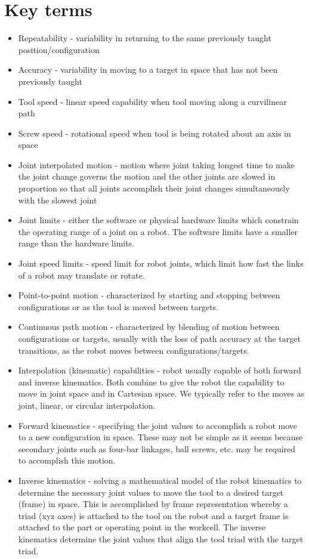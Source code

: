 \section{Key terms}
\begin{itemize}
\item 	Repeatability - variability in returning to the same previously taught position/configuration
\item Accuracy - variability in moving to a target in space that has not been previously taught
\item Tool speed - linear speed capability when tool moving along a curvilinear path
\item Screw speed - rotational speed when tool is being rotated about an axis in space
\item Joint interpolated motion - motion where joint taking longest time to make the joint change governs the motion and the other joints are slowed in proportion so that all joints accomplish their joint changes simultaneously with the slowest joint
\item Joint limits - either the software or physical hardware limits which constrain the operating range of a joint on a robot. The software limits have a smaller range than the hardware limits.
\item Joint speed limits - speed limit for robot joints, which limit how fast the links of a robot may translate or rotate.
\item Point-to-point motion - characterized by starting and stopping between configurations or as the tool is moved between targets.
\item Continuous path motion - characterized by blending of motion between configurations or targets, usually with the loss of path accuracy at the target transitions, as the robot moves between configurations/targets.
\item Interpolation (kinematic) capabilities - robot usually capable of both forward and inverse kinematics. Both combine to give the robot the capability to move in joint space and in  Cartesian space. We typically refer to the moves as joint, linear, or circular interpolation.
\item Forward kinematics - specifying the joint values to accomplish a robot move to a new configuration in space. These may not be simple as it seems because secondary joints such as four-bar linkages, ball screws, etc. may be required to accomplish this motion.
\item Inverse kinematics - solving a mathematical model of the robot kinematics to determine the necessary joint values to move the tool to a desired target (frame) in space. This is accomplished by frame representation whereby a triad (xyz axes) is attached to the tool on the robot and a target frame is attached to the part or operating point in the workcell. The inverse kinematics determine the joint values that align the tool triad with the target triad.

\end{itemize}
